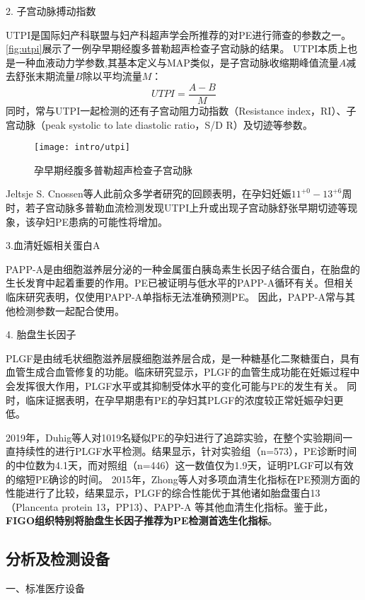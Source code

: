 2. 子宫动脉搏动指数

UTPI是国际妇产科联盟与妇产科超声学会所推荐的对PE进行筛查的参数之一\cite{FIGO,Sotiriadis2019}。\autoref{fig:utpi}展示了一例孕早期经腹多普勒超声检查子宫动脉的结果\cite{Sotiriadis2019}。
UTPI本质上也是一种血液动力学参数,其基本定义与MAP类似，是子宫动脉收缩期峰值流量$A$减去舒张末期流量$B$除以平均流量$M$\cite{Cnossen2008}：
\begin{equation}
    \label{equ:utpi}
    UTPI=\frac{A-B}{M}
\end{equation}
同时，常与UTPI一起检测的还有子宫动阻力动指数（Resistance index，RI）、子宫动脉（peak systolic to late diastolic ratio，S/D R）及切迹等参数\cite{Cnossen2008}。
\begin{figure}[htbp]
    \centering
    \texttt{[image: intro/utpi]}
    \caption{\label{fig:utpi}孕早期经腹多普勒超声检查子宫动脉}
\end{figure}
Jeltsje S. Cnossen等人\cite{Cnossen2008}此前众多学者研究的回顾表明，在孕妇妊娠$11^{+0}-13^{+6}$周时，若子宫动脉多普勒血流检测发现UTPI上升或出现子宫动脉舒张早期切迹等现象，该孕妇PE患病的可能性将增加\cite{OAG9,Plasencia2008}。

3.血清妊娠相关蛋白A

PAPP-A是由细胞滋养层分泌的一种金属蛋白胰岛素生长因子结合蛋白，在胎盘的生长发育中起着重要的作用。PE已被证明与低水平的PAPP-A循环有关\cite{FIGO}。但相关临床研究表明，仅使用PAPP-A单指标无法准确预测PE\cite{Smith2002}。
因此，PAPP-A常与其他检测参数一起配合使用\cite{Poon2009,Tan2018,Ray2018}。 

4. 胎盘生长因子

PLGF是由绒毛状细胞滋养层膜细胞滋养层合成，是一种糖基化二聚糖蛋白，具有血管生成合血管修复的功能。临床研究显示，PLGF的血管生成功能在妊娠过程中会发挥很大作用，PLGF水平或其抑制受体水平的变化可能与PE的发生有关\cite{Levine2004,Ahmad2004}。
同时，临床证据表明，在孕早期患有PE的孕妇其PLGF的浓度较正常妊娠孕妇更低\cite{Chau2017}。

2019年，Duhig等人\cite{Duhig2019}对1019名疑似PE的孕妇进行了追踪实验，在整个实验期间一直持续性的进行PLGF水平检测。结果显示，针对实验组（n=573），PE诊断时间的中位数为4.1天，而对照组（n=446）这一数值仅为1.9天，证明PLGF可以有效的缩短PE确诊的时间。
2015年，Zhong等人\cite{Zhong2015}对多项血清生化指标在PE预测方面的性能进行了比较，结果显示，PLGF的综合性能优于其他诸如胎盘蛋白13（Plancenta protein 13，PP13）、PAPP-A
等其他血清生化指标。鉴于此，\textbf{FIGO组织特别将胎盘生长因子推荐为PE检测首选生化指标}\cite{FIGO}。

\subsection{分析及检测设备}
一、标准医疗设备

